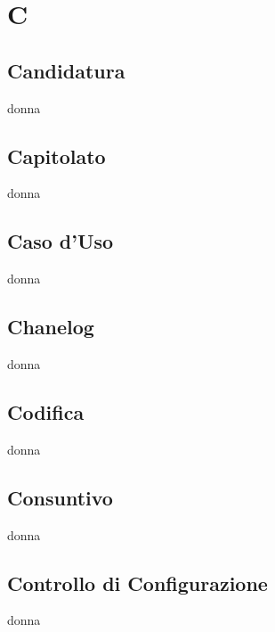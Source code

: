 \section{C} 
\subsection{Candidatura} 
donna
\subsection{Capitolato} 
donna
\subsection{Caso d'Uso} 
donna
\subsection{Chanelog} 
donna
\subsection{Codifica} 
donna
\subsection{Consuntivo} 
donna
\subsection{Controllo di Configurazione} 
donna
